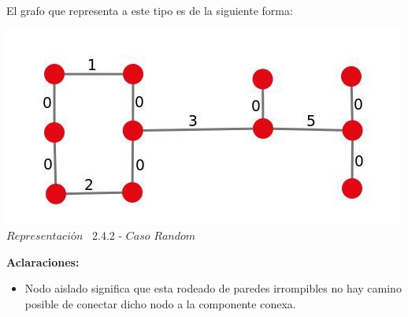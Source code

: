 El grafo que representa a este tipo es de la siguiente forma:\\

\vspace*{0.3cm} \vspace*{0.3cm}
  \begin{center}
 \includegraphics[scale=0.5]{./EJ2/ej2graforandom.jpeg}
 \\{$Representación$ \ 2.4.2 - $Caso$ $Random$}
  \end{center}
  \vspace*{0.3cm}


\textbf{Aclaraciones:} 
\begin{itemize}
\item Nodo aislado significa que esta rodeado de paredes irrompibles no hay camino posible de conectar dicho nodo a la componente conexa.
\end{itemize}